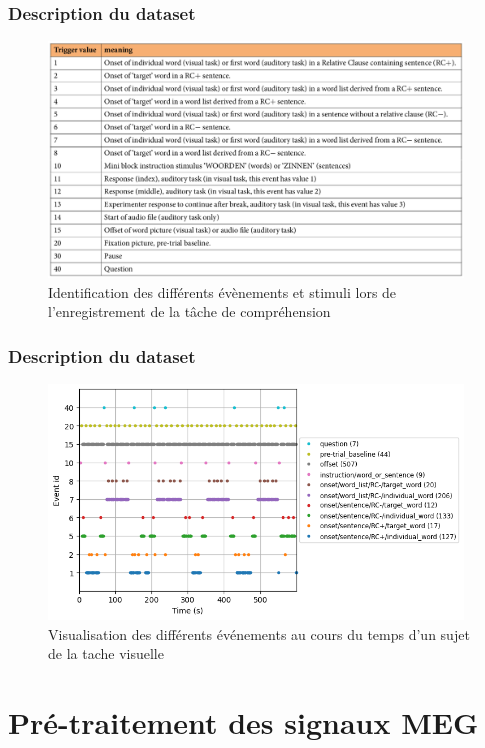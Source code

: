 \documentclass{beamer}
\begin{document}
\begin{frame}
\frametitle{Description du dataset}
\begin{figure}[!ht]
    \centering
    \includegraphics[width=11cm]{events_id.png}
    \caption{Identification des différents évènements et stimuli lors de l'enregistrement de la tâche de compréhension}
    \label{fig2.3}
\end{figure}
\end{frame}

\begin{frame}
\frametitle{Description du dataset}
\begin{figure}[!ht]
    \centering
    \includegraphics[width=11cm]{events_vis.png}
    \caption{Visualisation des différents événements au cours du temps d'un sujet de la tache visuelle}
    \label{fig3.5}
\end{figure}
\end{frame}

\section{Pré-traitement des signaux MEG}
\end{document}
